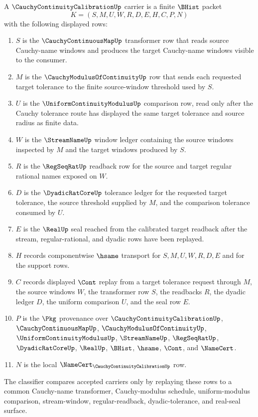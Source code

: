 \begin{definition}
\label{def:cauchy-continuity-calibration-carrier}
A $\CauchyContinuityCalibrationUp$ carrier is a finite $\BHist$ packet
$$
K=(S,M,U,W,R,D,E,H,C,P,N)
$$
with the following displayed rows:
\begin{enumerate}
\item $S$ is the $\CauchyContinuousMapUp$ transformer row that reads source Cauchy-name windows and produces the target Cauchy-name windows visible to the consumer.
\item $M$ is the $\CauchyModulusOfContinuityUp$ row that sends each requested target tolerance to the finite source-window threshold used by $S$.
\item $U$ is the $\UniformContinuityModulusUp$ comparison row, read only after the Cauchy tolerance route has displayed the same target tolerance and source radius as finite data.
\item $W$ is the $\StreamNameUp$ window ledger containing the source windows inspected by $M$ and the target windows produced by $S$.
\item $R$ is the $\RegSeqRatUp$ readback row for the source and target regular rational names exposed on $W$.
\item $D$ is the $\DyadicRatCoreUp$ tolerance ledger for the requested target tolerance, the source threshold supplied by $M$, and the comparison tolerance consumed by $U$.
\item $E$ is the $\RealUp$ seal reached from the calibrated target readback after the stream, regular-rational, and dyadic rows have been replayed.
\item $H$ records componentwise $\hsame$ transport for $S,M,U,W,R,D,E$ and for the support rows.
\item $C$ records displayed $\Cont$ replay from a target tolerance request through $M$, the source windows $W$, the transformer row $S$, the readbacks $R$, the dyadic ledger $D$, the uniform comparison $U$, and the seal row $E$.
\item $P$ is the $\Pkg$ provenance over $\CauchyContinuityCalibrationUp$, $\CauchyContinuousMapUp$, $\CauchyModulusOfContinuityUp$, $\UniformContinuityModulusUp$, $\StreamNameUp$, $\RegSeqRatUp$, $\DyadicRatCoreUp$, $\RealUp$, $\BHist$, $\hsame$, $\Cont$, and $\NameCert$.
\item $N$ is the local $\NameCert_{\CauchyContinuityCalibrationUp}$ row.
\end{enumerate}
The classifier compares accepted carriers only by replaying these rows to a common Cauchy-name transformer, Cauchy-modulus schedule, uniform-modulus comparison, stream-window, regular-readback, dyadic-tolerance, and real-seal surface.
\end{definition}

